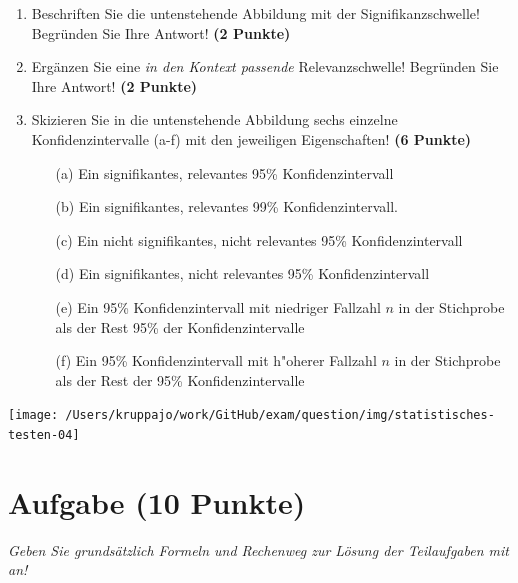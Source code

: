 \documentclass[a4paper, 9pt]{scrartcl}\usepackage[]{graphicx}\usepackage[]{xcolor}
\begin{document}
\begin{enumerate}
\item Beschriften Sie die untenstehende Abbildung mit der Signifikanzschwelle! Begründen Sie Ihre Antwort! \textbf{(2 Punkte)}
\item Ergänzen Sie eine \textit{in den Kontext passende} Relevanzschwelle! Begründen Sie Ihre Antwort! \textbf{(2 Punkte)} 
\item Skizieren Sie in die untenstehende Abbildung sechs einzelne Konfidenzintervalle (a-f) mit den
  jeweiligen Eigenschaften! \textbf{(6 Punkte)}
  \begin{itemize}
  \item[(a)] Ein signifikantes, relevantes 95\% Konfidenzintervall 	
  \item[(b)] Ein signifikantes, relevantes 99\% Konfidenzintervall. 	
  \item[(c)] Ein nicht signifikantes, nicht relevantes 95\% Konfidenzintervall 	
  \item[(d)] Ein signifikantes, nicht relevantes 95\% Konfidenzintervall 
  \item[(e)] Ein 95\% Konfidenzintervall mit niedriger Fallzahl $n$ in der Stichprobe als der Rest 95\% der Konfidenzintervalle
  \item[(f)] Ein 95\% Konfidenzintervall mit h{"o}herer Fallzahl $n$ in der Stichprobe als der Rest der 95\% Konfidenzintervalle
  \end{itemize}
\end{enumerate}

\begin{center}
  \texttt{[image: /Users/kruppajo/work/GitHub/exam/question/img/statistisches-testen-04]}
\end{center}


 
\clearpage

\section{Aufgabe \hfill (10 Punkte)}

\textit{Geben Sie grundsätzlich Formeln und Rechenweg zur Lösung der Teilaufgaben mit an!} \\[1Ex]
\end{document}
